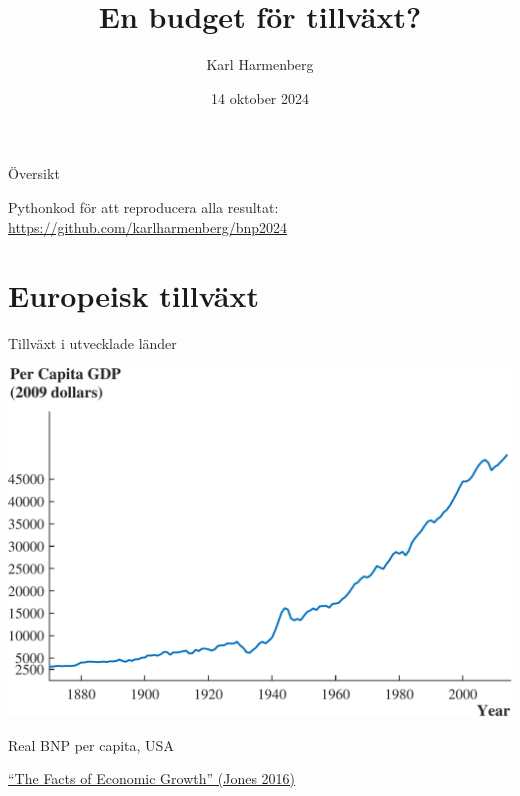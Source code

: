 \documentclass{beamer}
\title{En budget för tillväxt?}
\author{Karl Harmenberg}
\institute{\url{karlharmenberg.com}}
\date{14 oktober 2024}
\begin{document}
\frame{\titlepage}


\begin{frame}{Översikt}
    \tableofcontents

    \bigskip

    Pythonkod för att reproducera alla resultat: \url{https://github.com/karlharmenberg/bnp2024}
\end{frame}



\section{Europeisk tillväxt}

\begin{frame}{Tillväxt i utvecklade länder}

	\begin{center}
        \includegraphics[scale=0.4]{figures/uspcgdp1-crop.pdf}

        Real BNP per capita, USA
    \end{center}

    \bigskip

    {\footnotesize\color{blue}\href{https://web.stanford.edu/~chadj/facts.pdf}{``The Facts of Economic Growth'' (Jones 2016)}}
\end{frame}
\end{document}
